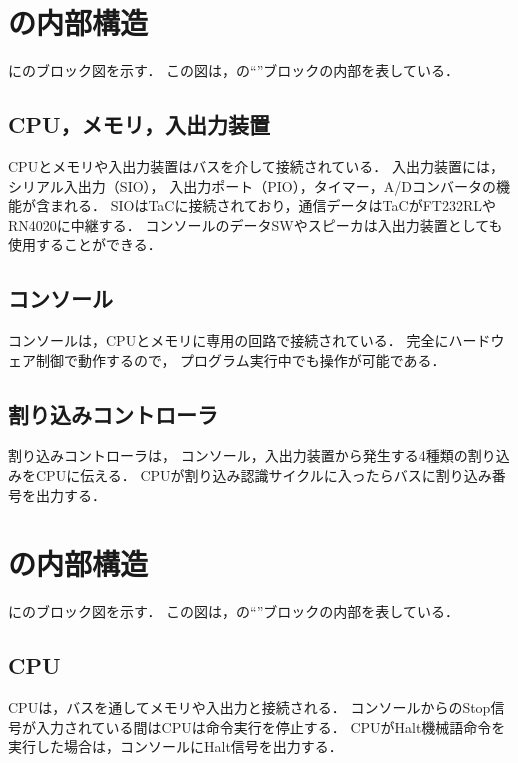 \section{{\tec}の内部構造}

に{\tec}のブロック図を示す．
この図は，の``{\tec}''ブロックの内部を表している．


\subsection{CPU，メモリ，入出力装置}
CPUとメモリや入出力装置はバスを介して接続されている．
入出力装置には，シリアル入出力（SIO），
入出力ポート（PIO），タイマー，A/Dコンバータの機能が含まれる．
SIOはTaCに接続されており，通信データはTaCがFT232RLやRN4020に中継する．
コンソールのデータSWやスピーカは入出力装置としても使用することができる．

\subsection{コンソール}
コンソールは，CPUとメモリに専用の回路で接続されている．
完全にハードウェア制御で動作するので，
プログラム実行中でも操作が可能である．

\subsection{割り込みコントローラ}
割り込みコントローラは，
コンソール，入出力装置から発生する4種類の割り込みをCPUに伝える．
CPUが割り込み認識サイクルに入ったらバスに割り込み番号を出力する．

\section{{\tac}の内部構造}

に{\tac}のブロック図を示す．
この図は，の``{\tac}''ブロックの内部を表している．


\subsection{CPU}
CPUは，バスを通してメモリや入出力と接続される．
コンソールからのStop信号が入力されている間はCPUは命令実行を停止する．
CPUがHalt機械語命令を実行した場合は，コンソールにHalt信号を出力する．

